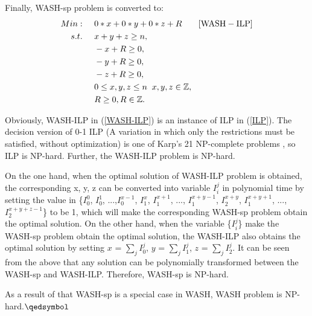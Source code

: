 \documentclass[conference]{IEEEtran}
\begin{document}
Finally, WASH-sp problem is converted to:
\begin{align}
Min:&\;\;\;\;\;0*x+0*y+0*z+R\;\;\;\;\;\;\;[\rm{WASH-ILP}]\label{WASH-ILP}\\
s.t. 
&\;\;\;\;\;x + y + z \geq n,\;\nonumber\\
&\;\;\;\;\;-x + R \geq 0, \nonumber\\
&\;\;\;\;\;-y + R \geq 0, \nonumber\\
&\;\;\;\;\;-z + R \geq 0, \nonumber\\
&\;\;\;\;\;0 \leq x, y, z \leq n  \;\;x, y, z\in\mathbb{Z},\nonumber\\
&\;\;\;\;\;R \geq 0, R\in\mathbb{Z}.\nonumber
\end{align}

Obviously, WASH-ILP in (\ref{WASH-ILP}) is an instance of ILP in (\ref{ILP}). The decision version of 0-1 ILP (A variation in which only the restrictions must be satisfied, without optimization) is one of Karp's 21 NP-complete problems  \cite{b9}, so ILP is NP-hard. Further, the WASH-ILP problem is NP-hard.

On the one hand, when the optimal solution of WASH-ILP problem is obtained, the corresponding {x, y, z} can be converted into variable {$I_i^j$} in polynomial time by setting the value in \{$I_0^0$, $I_0^1$, ...,$I_0^{x-1}$, $I_1^{x}$, $I_1^{x+1}$, ..., $I_1^{x+y-1}$, $I_2^{x+y}$, $I_1^{x+y+1}$, ..., $I_2^{x+y+z-1}$\} to be 1, which will make the corresponding WASH-sp problem obtain the optimal solution. On the other hand, when the variable \{$I_i^j$\} make the WASH-sp problem obtain the optimal solution, the WASH-ILP also obtains the optimal solution by setting $x$ = $\sum_{j}I_0^j$, $y$ = $\sum_{j}I_1^j$, $z$ = $\sum_{j}I_2^j$. It can be seen from the above that any solution can be polynomially transformed between the WASH-sp and WASH-ILP. Therefore, WASH-sp is NP-hard. 

As a result of that WASH-sp is a special case in WASH, WASH problem is NP-hard.\hfill $\qedsymbol$
\end{document}
